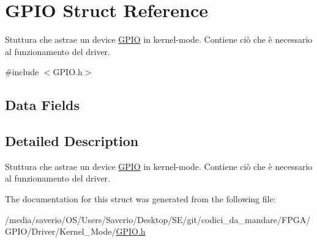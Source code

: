 \hypertarget{structGPIO}{}\section{G\+P\+IO Struct Reference}
\label{structGPIO}


Stuttura che astrae un device \hyperlink{structGPIO}{G\+P\+IO} in kernel-\/mode. Contiene ciò che è necessario al funzionamento del driver.  




{\ttfamily \#include $<$G\+P\+I\+O.\+h$>$}

\subsection*{Data Fields}


\subsection{Detailed Description}
Stuttura che astrae un device \hyperlink{structGPIO}{G\+P\+IO} in kernel-\/mode. Contiene ciò che è necessario al funzionamento del driver. 

The documentation for this struct was generated from the following file\+:\begin{DoxyCompactItemize}
\item 
/media/saverio/\+O\+S/\+Users/\+Saverio/\+Desktop/\+S\+E/git/codici\+\_\+da\+\_\+mandare/\+F\+P\+G\+A/\+G\+P\+I\+O/\+Driver/\+Kernel\+\_\+\+Mode/\hyperlink{GPIO_8h}{G\+P\+I\+O.\+h}\end{DoxyCompactItemize}
